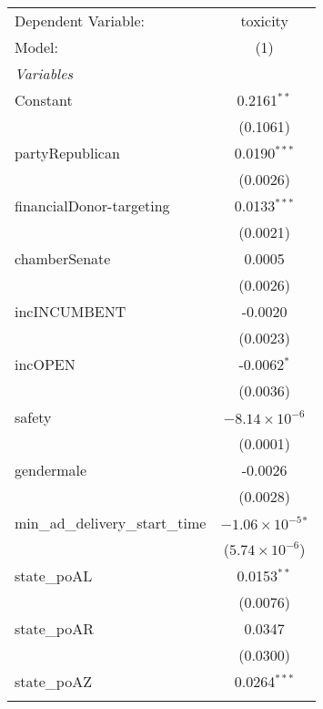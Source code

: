 \begingroup
\centering
\begin{tabular}{lc}
   \tabularnewline \midrule \midrule
   Dependent Variable:                & toxicity\\  
   Model:                             & (1)\\  
   \midrule
   \emph{Variables}\\
   Constant                           & 0.2161$^{**}$\\   
                                      & (0.1061)\\   
   partyRepublican                    & 0.0190$^{***}$\\   
                                      & (0.0026)\\   
   financialDonor-targeting           & 0.0133$^{***}$\\   
                                      & (0.0021)\\   
   chamberSenate                      & 0.0005\\   
                                      & (0.0026)\\   
   incINCUMBENT                       & -0.0020\\   
                                      & (0.0023)\\   
   incOPEN                            & -0.0062$^{*}$\\   
                                      & (0.0036)\\   
   safety                             & $-8.14\times 10^{-6}$\\    
                                      & (0.0001)\\   
   gendermale                         & -0.0026\\   
                                      & (0.0028)\\   
   min\_ad\_delivery\_start\_time     & $-1.06\times 10^{-5}$$^{*}$\\    
                                      & ($5.74\times 10^{-6}$)\\    
   state\_poAL                        & 0.0153$^{**}$\\   
                                      & (0.0076)\\   
   state\_poAR                        & 0.0347\\   
                                      & (0.0300)\\   
   state\_poAZ                        & 0.0264$^{***}$\\   
$$
\end{tabular}
